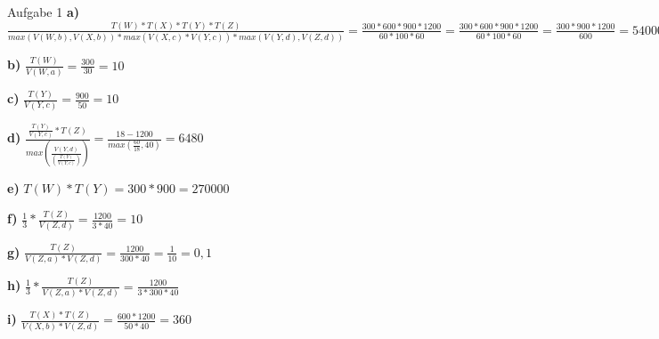 \documentclass[12pt]{article}
\begin{document}
\begin{section}{Aufgabe 1}
\textbf{a)} 
$\frac{T(W) * T(X) * T(Y) * T(Z)}{max( V(W,b), V(X,b) ) * max( V(X,c) * V(Y,c)) * max( V(Y,d), V(Z,d)) } = 
\frac{300 * 600 * 900 * 1200}{60 * 100 * 60} = \frac{300 * 600 * 900 * 1200}{60 * 100 * 60} =  \frac{300 * 900 * 1200}{600} = 540000$

\noindent \textbf{b)}
$\frac{T(W)}{V(W,a)}  = \frac{300}{30} = 10$

\noindent \textbf{c)}
$\frac{T(Y)}{V(Y,c)}  = \frac{900}{50} = 10$


\noindent \textbf{d)}
$\frac{\frac{T(Y)}{V(Y,c)} * T(Z)}{max( \frac{V(Y,d)}{(\frac{T(Y)}{V(Y,c)})})}  = \frac{18-1200}{max(\frac{60}{18},40)} = 6480 $

\noindent \textbf{e)}
$T(W)*T(Y) = 300 * 900 = 270000$

\noindent \textbf{f)}
$\frac{1}{3} * \frac{T(Z)}{V(Z,d)} = \frac{1200}{3*40}=10$

\noindent \textbf{g)}
$\frac{T(Z)}{V(Z,a)*V(Z,d)} = \frac{1200}{300*40} = \frac{1}{10} =0,1$

\noindent \textbf{h)}
$\frac{1}{3} * \frac{T(Z)}{V(Z,a)*V(Z,d)} = \frac{1200}{3*300*40}$

\noindent \textbf{i)}
$\frac{T(X)*T(Z)}{V(X,b)*V(Z,d)} = \frac{600*1200}{50*40} = 360$

\end{section}
\end{document}
